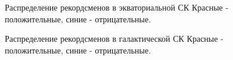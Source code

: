 \documentclass[14pt,aspectratio=43]{beamer}
\begin{document}
\begin{frame}[<alignment>]

\begin{figure}[h!]
\caption{Распределение рекордсменов в экваториальной СК  Красные - положительные, синие - отрицательные.}
\end{figure}
\end{frame}

\begin{frame}[<alignment>]
\begin{figure}[h!]
\caption{Распределение рекордсменов в галактической СК Красные - положительные, синие - отрицательные.}
\label{img:75maxlb}
\end{figure}
\end{frame}
\end{document}
